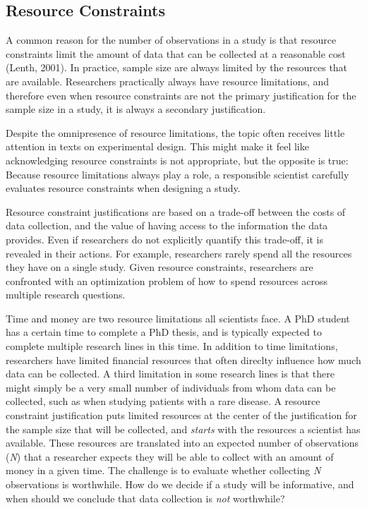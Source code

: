 \documentclass[
  english,
  ,jou, a4paper,floatsintext]{apa6}
\begin{document}
\hypertarget{resource-constraints}{%
\subsection{Resource Constraints}\label{resource-constraints}}

A common reason for the number of observations in a study is that resource constraints limit the amount of data that can be collected at a reasonable cost (Lenth, 2001). In practice, sample size are always limited by the resources that are available. Researchers practically always have resource limitations, and therefore even when resource constraints are not the primary justification for the sample size in a study, it is always a secondary justification.

Despite the omnipresence of resource limitations, the topic often receives little attention in texts on experimental design. This might make it feel like acknowledging resource constraints is not appropriate, but the opposite is true: Because resource limitations always play a role, a responsible scientist carefully evaluates resource constraints when designing a study.

Resource constraint justifications are based on a trade-off between the costs of data collection, and the value of having access to the information the data provides. Even if researchers do not explicitly quantify this trade-off, it is revealed in their actions. For example, researchers rarely spend all the resources they have on a single study. Given resource constraints, researchers are confronted with an optimization problem of how to spend resources across multiple research questions.

Time and money are two resource limitations all scientists face. A PhD student has a certain time to complete a PhD thesis, and is typically expected to complete multiple research lines in this time. In addition to time limitations, researchers have limited financial resources that often direclty influence how much data can be collected. A third limitation in some research lines is that there might simply be a very small number of individuals from whom data can be collected, such as when studying patients with a rare disease. A resource constraint justification puts limited resources at the center of the justification for the sample size that will be collected, and \emph{starts} with the resources a scientist has available. These resources are translated into an expected number of observations (\emph{N}) that a researcher expects they will be able to collect with an amount of money in a given time. The challenge is to evaluate whether collecting \emph{N} observations is worthwhile. How do we decide if a study will be informative, and when should we conclude that data collection is \emph{not} worthwhile?
\end{document}
